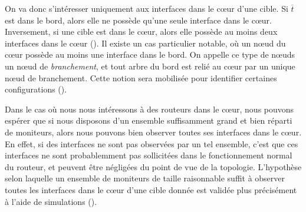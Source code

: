 On va donc s'intéresser uniquement aux interfaces dans le c\oe{}ur d'une cible. Si
$\overline{t}$ est dans le bord, alors elle ne possède qu'une seule interface
dans le c\oe{}ur. Inversement, si une cible est dans le c\oe{}ur, alors elle
possède au moins deux interfaces dans le c\oe{}ur (). Il existe un cas
particulier notable, où un n\oe{}ud du c\oe{}ur possède au moins une interface dans le
bord. On appelle ce type de n\oe{}uds un n\oe{}ud de {\em branchement}, et tout arbre
du bord est relié au c\oe{}ur par un unique n\oe{}ud de branchement. Cette notion sera
mobilisée pour identifier certaines configurations
().

Dans le cas où nous nous intéressons à des routeurs dans le c\oe{}ur, nous
pouvons espérer que si nous disposons d'un ensemble suffisamment grand et bien
réparti de moniteurs, alors nous pouvons bien observer toutes ses interfaces
dans le c\oe{}ur. En effet, si des interfaces ne sont pas observées par un tel
ensemble, c'est que ces interfaces ne sont probablemment pas sollicitées dans le
fonctionnement normal du routeur, et peuvent être négligées du point de vue de
la topologie. L'hypothèse selon laquelle un ensemble de moniteurs de taille
raisonnable suffit à observer toutes les interfaces dans le c\oe{}ur d'une cible
donnée est validée plus précisément à l'aide de simulations
().

